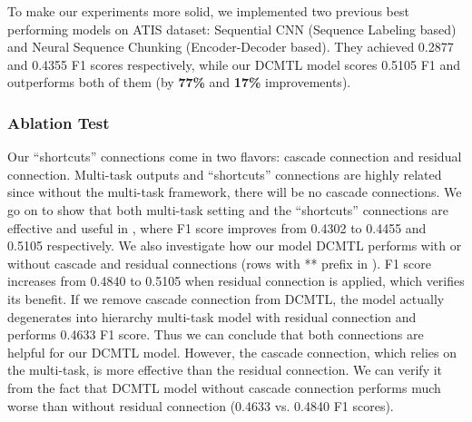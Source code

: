 To make our experiments more solid, 
we implemented two previous best performing models on ATIS dataset: 
Sequential CNN \cite{vu2016sequential} (Sequence Labeling based) and Neural Sequence Chunking \cite{zhai2017neural} (Encoder-Decoder based).
They achieved 0.2877 and 0.4355 F1 scores respectively, while
our DCMTL model scores 0.5105 F1 and outperforms both of them (by \textbf{77\%} and \textbf{17\%} improvements).

\subsubsection{Ablation Test}
Our ``shortcuts'' connections come in two flavors: cascade connection and residual connection.
Multi-task outputs and ``shortcuts'' connections are highly related since without the multi-task framework, there will be no cascade connections.
We go on to show that both multi-task setting and the ``shortcuts'' connections are effective and useful in ,
where F1 score improves from 0.4302 to 0.4455 and 0.5105 respectively.
We also investigate how our model DCMTL performs with or without cascade and residual connections (rows with ** prefix in ).
F1 score increases from 0.4840 to 0.5105 when residual connection is applied, which verifies its benefit.
If we remove cascade connection from DCMTL,
the model actually degenerates into hierarchy multi-task model with residual connection and performs 0.4633 F1 score.
Thus we can conclude that both connections are helpful for our DCMTL model.
However, the cascade connection, which relies on the multi-task, is more effective than the residual connection.
We can verify it from the fact that DCMTL model without cascade connection performs much worse than without residual connection (0.4633 vs. 0.4840 F1 scores).

